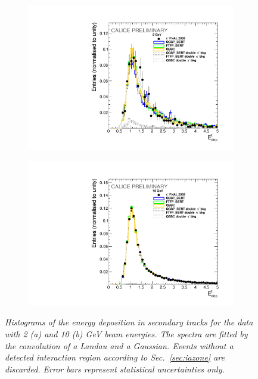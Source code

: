 \begin{figure}
	\centering
	\begin{subfigure}{0.5\textwidth}
		\centering
		\includegraphics[width=.90\linewidth]{ECAL/plots/calibrationfit-2.pdf}
		\caption{\label{fig:calib2F} }
	\end{subfigure}%
	\begin{subfigure}{0.5\textwidth}
		\centering
		\includegraphics[width=.90\linewidth]{ECAL/plots/calibrationfit-10.pdf}
		\caption{\label{fig:calib10F} }
	\end{subfigure}
	\caption{\label{fig:calibF} \sl Histograms of the energy deposition in secondary tracks for the data with 2 (a) and 10 (b) GeV beam energies. The spectra are fitted by the convolution of a Landau and a Gaussian. Events without a detected interaction region according to Sec.~\ref{sec:iazone} are discarded. Error bars represent statistical uncertainties only.}
\end{figure}

